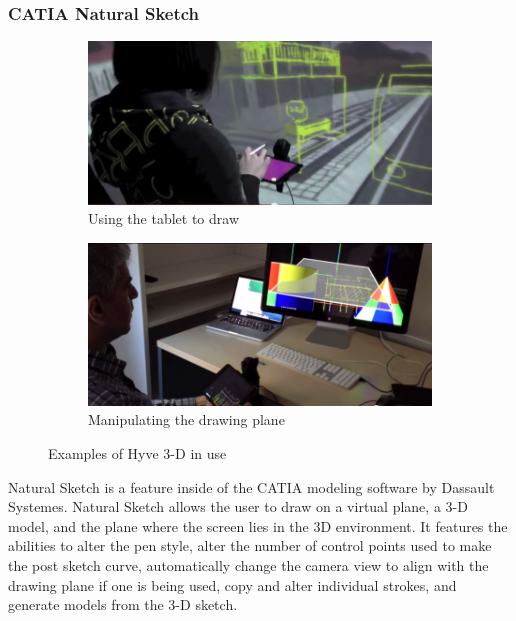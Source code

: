 \documentclass{article}
\begin{document}
\subsubsection{CATIA Natural Sketch}

\begin{figure}[h!]

\begin{subfigure}{\textwidth}
\includegraphics[width=0.9\linewidth]{Hyve3D1}
\caption{Using the tablet to draw}
\end{subfigure}
\begin{subfigure}{\textwidth}
\includegraphics[width=0.9\linewidth]{Hyve3D2}
\caption{Manipulating the drawing plane}
\end{subfigure}

\caption{Examples of Hyve 3-D in use}
\end{figure}

Natural Sketch is a feature inside of the CATIA modeling software by Dassault Systemes. Natural Sketch allows the user to draw on a virtual plane, a 3-D model, and the plane where the screen lies in the 3D environment. It features the abilities to alter the pen style, alter the number of control points used to make the post sketch curve, automatically change the camera view to align with the drawing plane if one is being used, copy and alter individual strokes, and generate models from the 3-D sketch.
\end{document}
